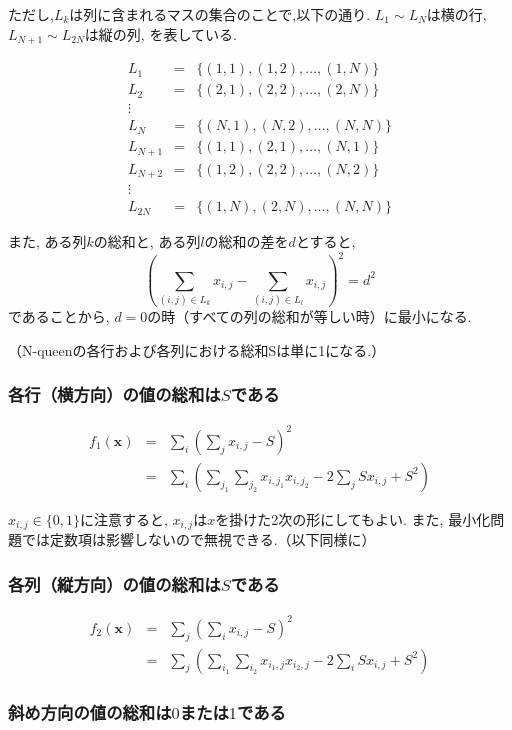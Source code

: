 \documentclass[uplatex,dvipdfmx,a4paper,11pt,oneside,openany]{jsbook}
\begin{document}
ただし,$L_k$は列に含まれるマスの集合のことで,以下の通り. $L_1 \sim L_{N}$は横の行, $L_{N+1} \sim L_{2N}$は縦の列, を表している.

\begin{eqnarray*}
L_1 &=& \{(1,1),(1,2),\dots,(1,N)\}\\
L_2 &=& \{(2,1),(2,2),\dots,(2,N)\}\\
\vdots\\
L_{N} &=& \{(N,1),(N,2),\dots,(N,N)\}\\
L_{N+1} &=& \{(1,1),(2,1),\dots,(N,1)\}\\
L_{N+2} &=& \{(1,2),(2,2),\dots,(N,2)\}\\
\vdots\\
L_{2N} &=& \{(1,N),(2,N),\dots,(N,N)\}
\end{eqnarray*}

また, ある列$k$の総和と, ある列$l$の総和の差を$d$とすると,
\[
\left(\sum_{(i,j)\in L_{k}} x_{i,j} - \sum_{(i,j)\in L_{l}}x_{i,j} \right)^2 = d^2
\]
であることから, $d=0$の時（すべての列の総和が等しい時）に最小になる.

（N-queenの各行および各列における総和Sは単に1になる.）

\subsubsection{各行（横方向）の値の総和は$S$である}

\begin{eqnarray*}
f_1(\bm{x})&=&\sum_i\left(\sum_jx_{i,j}-S\right)^2\\
&=&\sum_i\left(\sum_{j_1}\sum_{j_2}x_{i,j_1}x_{i,j_2} - 2 \sum_j S x_{i,j} + S^2\right)
\end{eqnarray*}

$x_{i,j}\in \{0,1\}$に注意すると, $x_{i,j}$は$x$を掛けた2次の形にしてもよい. また,
最小化問題では定数項は影響しないので無視できる.（以下同様に）

\subsubsection{各列（縦方向）の値の総和は$S$である}

\begin{eqnarray*}
f_2(\bm{x})&=&\sum_j\left(\sum_i x_{i,j}-S\right)^2\\
&=&\sum_j\left(\sum_{i_1}\sum_{i_2}x_{i_1,j}x_{i_2,j} - 2 \sum_i S x_{i,j} + S^2\right)
\end{eqnarray*}

\subsubsection{斜め方向の値の総和は$0$または$1$である}
\end{document}
